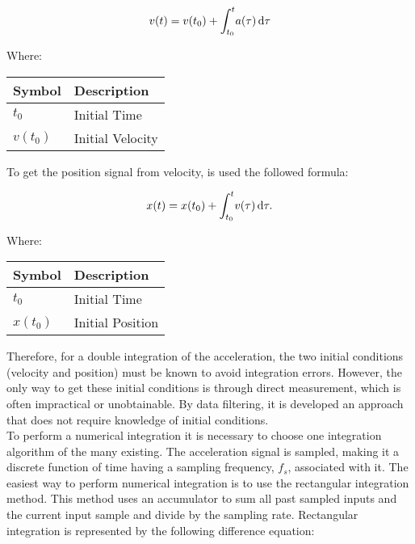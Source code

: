 \documentclass{standalone}
\begin{document}
\begin{center}
\begin{equation}
 {\large v(t) = v(t_{0}) + \int_{t_{0}}^{t} \! a(\tau) \, \mathrm{d}\tau}
\end{equation}

Where: \\
\begin{table}[ht]
\centering
    \begin{tabular}{ | l | l |}
    
    \hline
    Symbol & Description \\ \hline
   \quad  $t_{0}$ & Initial Time \\ \hline
	   \quad  $v(t_{0})$ & Initial Velocity\\  
\hline 
    \end{tabular}
\end{table}
\end{center}

\noindent To get the position signal from velocity, is used the followed formula:
\begin{center}
\begin{equation}
 {\large x(t) = x(t_{0}) + \int_{t_{0}}^{t} \! v(\tau) \, \mathrm{d}\tau.}
\end{equation}

Where: \\
\begin{table}[ht]
\centering
    \begin{tabular}{ | l | l |}
    
    \hline
    Symbol & Description \\ \hline
   \quad  $t_{0}$ & Initial Time \\ \hline
	   \quad  $x(t_{0})$ & Initial Position \\  
\hline 
    \end{tabular}
\end{table}
\end{center}
\noindent Therefore, for a double integration of the acceleration, the two initial
conditions (velocity and position) must be known to avoid integration errors. However,
the only way to get these initial conditions is through direct measurement, which is often
impractical or unobtainable. By  data filtering, it is developed an approach that does not require knowledge of initial conditions.\\
To perform a numerical integration it is necessary to choose one integration algorithm of the many existing. 
The acceleration signal is sampled, making it a discrete function of time having a sampling frequency, $f_{s}$, associated with it. The easiest way to perform numerical integration is to use the rectangular integration method. This method uses an accumulator to sum all past sampled inputs and the current input sample and divide by the sampling rate. Rectangular integration is represented by the following difference equation:
\end{document}
